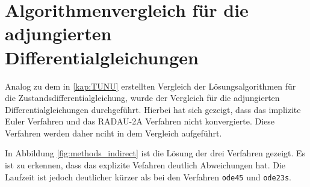 \chapter{Algorithmenvergleich für die adjungierten Differentialgleichungen}\label{appendix:methods}
Analog zu dem in \autoref{kap:TUNU} erstellten Vergleich der Lösungsalgorithmen für die Zustandsdifferentialgleichung, wurde der Vergleich für die adjungierten Differentialgleichungen durchgeführt.
Hierbei hat sich gezeigt, dass das implizite Euler Verfahren und das RADAU-2A Verfahren nicht konvergierte. Diese Verfahren werden daher nciht in dem Vergleich aufgeführt.

In Abbildung \autoref{fig:methods_indirect} ist die Lösung der drei Verfahren gezeigt. Es ist zu erkennen, dass das explizite Vefahren deutlich Abweichungen hat. Die Laufzeit ist jedoch deutlicher kürzer als bei den Verfahren \verb+ode45+ und \verb+ode23s+.

\begin{figure}[htbp]
    \centering 
    \qquad
     \\

    \qquad
     \\

    \qquad
     \\

    \qquad
     \\

     \label{fig:methods_indirect}
\end{figure}

